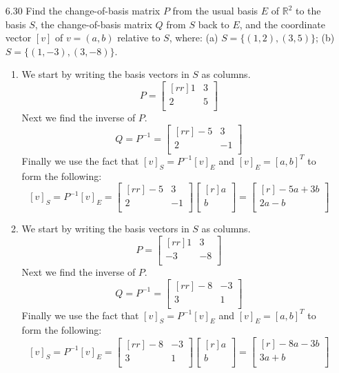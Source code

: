 \documentclass[12pt]{article}
\theoremstyle{definition}
\theoremstyle{plain}
\begin{document}
\begin{enumerate}
\item[6.30] Find the change-of-basis matrix $P$ from the usual basis $E$ of $\mathbb{R}^2$ to the basis $S$, the change-of-basis matrix $Q$ from $S$ back to $E$, and the coordinate vector $[v]$ of $v=(a,b)$ relative to $S$, where: (a) $S=\{(1,2),(3,5)\}$; (b) $S=\{(1,-3),(3,-8)\}$.
	\begin{enumerate}
\pagebreak
	\item We start by writing the basis vectors in $S$ as columns.
	\[ P = \begin{bmatrix}[rr]1&3\\2&5\\\end{bmatrix} \]
	Next we find the inverse of $P$.
	\[ Q = P^{-1} = \begin{bmatrix}[rr]-5&3\\2&-1\\\end{bmatrix} \]
	Finally we use the fact that $[v]_S=P^{-1}[v]_E$ and $[v]_E=[a,b]^T$ to form the following:
	\[ [v]_S = P^{-1}[v]_E=\begin{bmatrix}[rr]-5&3\\2&-1\\\end{bmatrix}\begin{bmatrix}[r]a\\b\\\end{bmatrix}=\begin{bmatrix}[r]-5a+3b\\2a-b\\\end{bmatrix} \]
	\item We start by writing the basis vectors in $S$ as columns.
	\[ P = \begin{bmatrix}[rr]1&3\\-3&-8\\\end{bmatrix} \]
	Next we find the inverse of $P$.
	\[ Q = P^{-1} = \begin{bmatrix}[rr]-8&-3\\3&1\\\end{bmatrix} \]
	Finally we use the fact that $[v]_S=P^{-1}[v]_E$ and $[v]_E=[a,b]^T$ to form the following:
	\[ [v]_S = P^{-1}[v]_E=\begin{bmatrix}[rr]-8&-3\\3&1\\\end{bmatrix}\begin{bmatrix}[r]a\\b\\\end{bmatrix}=\begin{bmatrix}[r]-8a-3b\\3a+b\\\end{bmatrix} \]
	\end{enumerate}
	

\end{enumerate}
\end{document}
